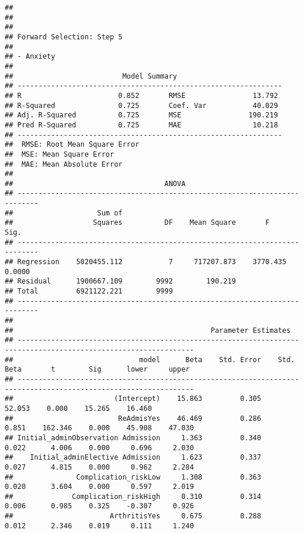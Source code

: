 \documentclass[
]{article}
\begin{document}
\begin{verbatim}
## 
## 
## 
## Forward Selection: Step 5 
## 
## - Anxiety 
## 
##                          Model Summary                          
## ---------------------------------------------------------------
## R                       0.852       RMSE                13.792 
## R-Squared               0.725       Coef. Var           40.029 
## Adj. R-Squared          0.725       MSE                190.219 
## Pred R-Squared          0.725       MAE                 10.218 
## ---------------------------------------------------------------
##  RMSE: Root Mean Square Error 
##  MSE: Mean Square Error 
##  MAE: Mean Absolute Error 
## 
##                                    ANOVA                                    
## ---------------------------------------------------------------------------
##                    Sum of                                                  
##                   Squares          DF    Mean Square       F          Sig. 
## ---------------------------------------------------------------------------
## Regression    5020455.112           7     717207.873    3770.435    0.0000 
## Residual      1900667.109        9992        190.219                       
## Total         6921122.221        9999                                      
## ---------------------------------------------------------------------------
## 
##                                               Parameter Estimates                                                
## ----------------------------------------------------------------------------------------------------------------
##                              model      Beta    Std. Error    Std. Beta       t        Sig      lower     upper 
## ----------------------------------------------------------------------------------------------------------------
##                        (Intercept)    15.863         0.305                  52.053    0.000    15.265    16.460 
##                         ReAdmisYes    46.469         0.286        0.851    162.346    0.000    45.908    47.030 
## Initial_adminObservation Admission     1.363         0.340        0.022      4.006    0.000     0.696     2.030 
##    Initial_adminElective Admission     1.623         0.337        0.027      4.815    0.000     0.962     2.284 
##               Complication_riskLow     1.308         0.363        0.020      3.604    0.000     0.597     2.019 
##              Complication_riskHigh     0.310         0.314        0.006      0.985    0.325    -0.307     0.926 
##                       ArthritisYes     0.675         0.288        0.012      2.346    0.019     0.111     1.240 

\end{verbatim}
\end{document}
